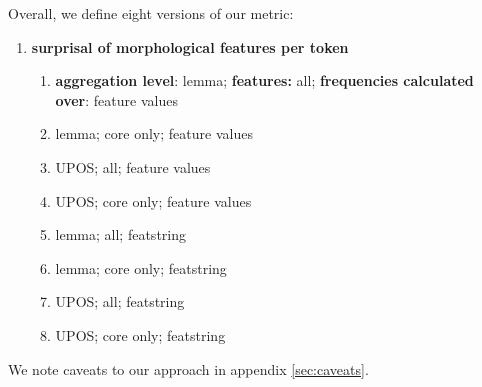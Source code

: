 \documentclass[USenglish]{article}
\begin{document}
Overall, we define eight versions of our metric:

\begin{enumerate}
    \item \textbf{surprisal of morphological features per token}
    \begin{enumerate}
  \renewcommand{\labelenumi}{\alph{enumi})}
  \item \textbf{aggregation level}: lemma; \textbf{features:} all; \textbf{frequencies calculated over}: feature values
  \item lemma; core only; feature values
  \item UPOS; all; feature values
  \item UPOS; core only; feature values
  \item lemma; all; featstring
  \item lemma; core only; featstring
  \item UPOS; all; featstring
  \item UPOS; core only; featstring
\end{enumerate}
\end{enumerate}

We note caveats to our approach in appendix \ref{sec:caveats}. 
\end{document}
